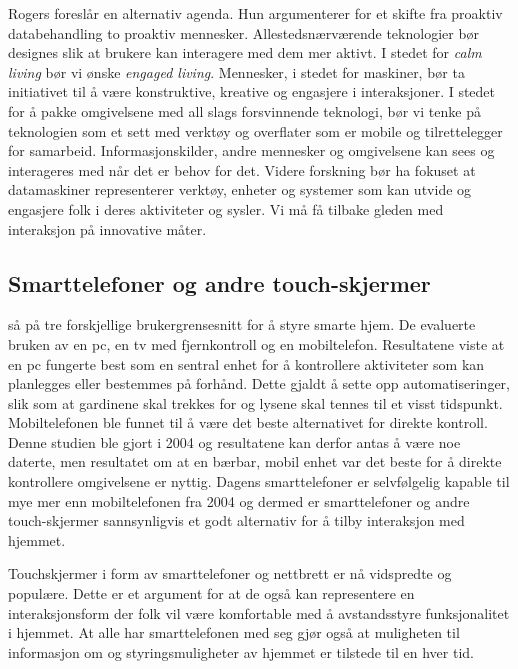 Rogers foreslår en alternativ agenda. Hun argumenterer for et skifte fra proaktiv databehandling to proaktiv mennesker. Allestedsnærværende teknologier bør designes slik at brukere kan interagere med dem mer aktivt. I stedet for \emph{calm living} bør vi ønske \emph{engaged living}. Mennesker, i stedet for maskiner, bør ta initiativet til å være konstruktive, kreative og engasjere i interaksjoner. I stedet for å pakke omgivelsene med all slags forsvinnende teknologi, bør vi tenke på teknologien som et sett med verktøy og overflater som er mobile og tilrettelegger for samarbeid. Informasjonskilder, andre mennesker og omgivelsene kan sees og interageres med når det er behov for det. Videre forskning bør ha fokuset at datamaskiner representerer verktøy, enheter og systemer som kan utvide og engasjere folk i deres aktiviteter og sysler. Vi må få tilbake gleden med interaksjon på innovative måter.

\subsection*{Smarttelefoner og andre touch-skjermer}
\citet{koskela04} så på tre forskjellige brukergrensesnitt for å styre smarte hjem. De evaluerte bruken av en pc, en tv med fjernkontroll og en mobiltelefon. Resultatene viste at en pc fungerte best som en sentral enhet for å kontrollere aktiviteter som kan planlegges eller bestemmes på forhånd. Dette gjaldt å sette opp automatiseringer, slik som at gardinene skal trekkes for og lysene skal tennes til et visst tidspunkt. Mobiltelefonen ble funnet til å være det beste alternativet for direkte kontroll. Denne studien ble gjort i 2004 og resultatene kan derfor antas å være noe daterte, men resultatet om at en bærbar, mobil enhet var det beste for å direkte kontrollere omgivelsene er nyttig. Dagens smarttelefoner er selvfølgelig kapable til mye mer enn mobiltelefonen fra 2004 og dermed er smarttelefoner og andre touch-skjermer sannsynligvis et godt alternativ for å tilby interaksjon med hjemmet.

Touchskjermer i form av smarttelefoner og nettbrett er nå vidspredte og populære. Dette er et argument for at de også kan representere en interaksjonsform der folk vil være komfortable med å avstandsstyre funksjonalitet i hjemmet. At alle har smarttelefonen med seg gjør også at muligheten til informasjon om og styringsmuligheter av hjemmet er tilstede til en hver tid.

